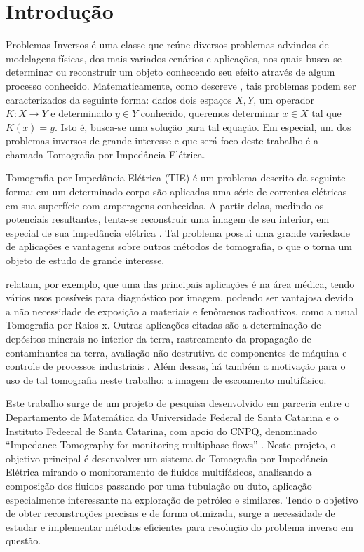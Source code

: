 	\chapter*{Introdução}

Problemas Inversos é uma classe que reúne diversos problemas advindos de modelagens físicas, dos mais variados cenários e aplicações, nos quais busca-se determinar ou reconstruir um objeto conhecendo seu efeito através de algum processo conhecido. Matematicamente, como descreve , tais problemas podem ser caracterizados da seguinte forma: dados dois espaços $X,Y$, um operador $K: X \to Y$ e determinado $y\in Y$ conhecido, queremos determinar $x\in X$ tal que $K(x) = y$. Isto é, busca-se uma solução para tal equação. Em especial, um dos problemas inversos de grande interesse e que será foco deste trabalho é a chamada Tomografia por Impedância Elétrica.

Tomografia por Impedância Elétrica (TIE) é um problema descrito da seguinte forma: em um determinado corpo são aplicadas uma série de correntes elétricas em sua superfície com amperagens conhecidas. A partir delas, medindo os potenciais resultantes, tenta-se reconstruir uma imagem de seu interior, em especial de sua impedância elétrica \cite{somersalo}. Tal problema possui uma grande variedade de aplicações e vantagens sobre outros métodos de tomografia, o que o torna um objeto de estudo de grande interesse. 

 relatam, por exemplo, que uma das principais aplicações é na área médica, tendo vários usos possíveis para diagnóstico por imagem, podendo ser vantajosa devido a não necessidade de exposição a materiais e fenômenos radioativos, como a usual Tomografia por Raios-x. Outras aplicações citadas são a determinação de depósitos minerais no interior da terra, rastreamento da propagação de contaminantes na terra, avaliação não-destrutiva de componentes de máquina e controle de processos industriais \cite{cheney}. Além dessas, há também a motivação para o uso de tal tomografia neste trabalho: a imagem de escoamento multifásico.

Este trabalho surge de um projeto de pesquisa desenvolvido em parceria entre o Departamento de Matemática da Universidade Federal de Santa Catarina e o Instituto Fedeeral de Santa Catarina, com apoio do CNPQ, denominado “Impedance Tomography for monitoring multiphase flows” \cite{margotti-eit}. Neste projeto, o objetivo principal é desenvolver um sistema de Tomografia por Impedância Elétrica mirando o monitoramento de fluidos multifásicos, analisando a composição dos fluidos passando por uma tubulação ou duto, aplicação especialmente interessante na exploração de petróleo e similares. Tendo o objetivo de obter reconstruções precisas e de forma otimizada, surge a necessidade de estudar e implementar métodos eficientes para resolução do problema inverso em questão.

